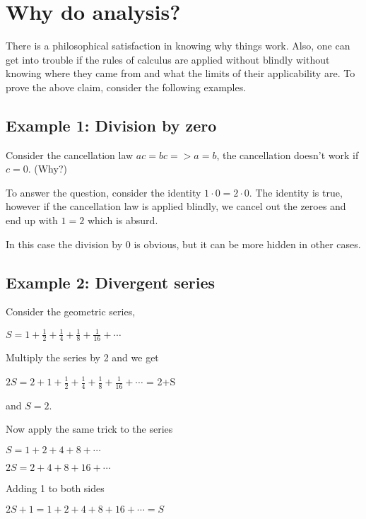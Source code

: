 \documentclass[10pt]{article}
\begin{document}
\section*{Why do analysis?}
There is a philosophical satisfaction in knowing why things work. Also, one can
get into trouble if the rules of calculus are applied without blindly without
knowing where they came from and what the limits of their applicability are.
\break
To prove the above claim, consider the following examples.

\subsection*{Example 1: Division by zero}
Consider the cancellation law \( ac = bc => a = b \), the cancellation doesn't
work if \( c = 0 \). (Why?)

To answer the question, consider the identity \( 1 \cdot 0 = 2 \cdot 0 \). The
identity is true, however if the cancellation law is applied blindly, we cancel
out the zeroes and end up with \( 1 = 2 \) which is absurd.

In this case the division by 0 is obvious, but it can be more hidden in other
cases.

\subsection*{Example 2: Divergent series}
Consider the geometric series,

\begin{center}
  \( S = 1 + \frac{1}{2} + \frac{1}{4} + \frac{1}{8} + \frac{1}{16} + \cdots \)
\end{center}

Multiply the series by 2 and we get

\begin{center}
  \( 2S = 2 + 1 + \frac{1}{2}+\frac{1}{4}+\frac{1}{8}+\frac{1}{16} + \cdots \) =
  2+S
\end{center}
and \( S = 2 \).

\break
Now apply the same trick to the series

\begin{center}
  \( S = 1 + 2 + 4 + 8 + \cdots \)

  \( 2S = 2 + 4 + 8 + 16 + \cdots \)
\end{center}

Adding 1 to both sides
\begin{center}
  \( 2S + 1 = 1 + 2 + 4 + 8 + 16 + \cdots = S \)
\end{center}
\end{document}
